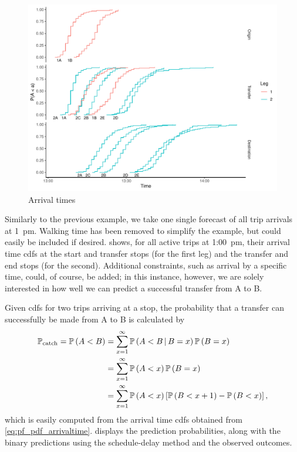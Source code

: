 \begin{knitrout}\small
{}\color{fgcolor}\begin{figure}

{\centering \includegraphics[width=\textwidth]{figure/eta_journey_transfer_graph-1} 

}

\caption[Arrival times]{Arrival times}\label{fig:eta_journey_transfer_graph}
\end{figure}


\end{knitrout}


Similarly to the previous example, we take one single forecast of all trip arrivals at 1~pm. Walking time has been removed to simplify the example, but could easily be included if desired.  shows, for all active trips at  1:00~pm, their arrival time \glspl{cdf} at the start and transfer stops (for the first leg) and the transfer and end stops (for the second). Additional constraints, such as arrival by a specific time, could, of course, be added; in this instance, however, we are solely interested in how well we can predict a successful transfer from A to B.


Given \glspl{cdf} for two trips arriving at a stop, the probability that a transfer can successfully be made from A to B is calculated by
\begin{equation}
\label{eq:eta_total_prob}
\begin{split}
\mathbb{P}_\text{catch} =
\mathbb{P}\left(A < B\right) &= \sum_{x=1}^{\infty} \mathbb{P}\left(A < B\,|\,B = x\right)\mathbb{P}\left(B=x\right) \\
  &= \sum_{x=1}^\infty
    \mathbb{P}\left(A < x\right) \mathbb{P}\left(B=x\right) \\
  &= \sum_{x=1}^\infty
    \mathbb{P}\left(A < x\right) \left[
      \mathbb{P}\left(B < x + 1\right) - \mathbb{P}\left(B < x\right)
    \right],
\end{split}
\end{equation}
which is easily computed from the arrival time \glspl{cdf} obtained from \cref{eq:pf_pdf_arrivaltime}.  displays the prediction probabilities, along with the binary predictions using the schedule-delay method and the observed outcomes.


